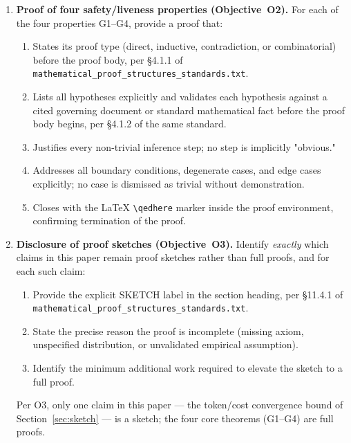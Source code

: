 \documentclass[12pt]{article}
\theoremstyle{definition}
\newcommand{\code}[1]{\texttt{#1}}
\newcommand{\ProofStd}{\code{mathematical\_proof\_\allowbreak structures\_standards.txt}}
\begin{document}
\begin{enumerate}
    \item \textbf{Proof of four safety/liveness properties (Objective~O2).}
          For each of the four properties G1--G4, provide a proof that:
          \begin{enumerate}
              \item[O2a.] States its proof type (direct, inductive,
                          contradiction, or combinatorial) before the proof
                          body, per \S4.1.1 of \ProofStd{}.
              \item[O2b.] Lists all hypotheses explicitly and validates
                          each hypothesis against a cited governing
                          document or standard mathematical fact before the
                          proof body begins, per \S4.1.2 of the same
                          standard.
              \item[O2c.] Justifies every non-trivial inference step;
                          no step is implicitly "obvious."
              \item[O2d.] Addresses all boundary conditions, degenerate
                          cases, and edge cases explicitly; no case is
                          dismissed as trivial without demonstration.
              \item[O2e.] Closes with the \LaTeX{} \verb|\qedhere| marker
                          inside the proof environment, confirming
                          termination of the proof.
          \end{enumerate}

    \item \textbf{Disclosure of proof sketches (Objective~O3).}
          Identify \emph{exactly} which claims in this paper remain proof
          sketches rather than full proofs, and for each such claim:
          \begin{enumerate}
              \item[O3a.] Provide the explicit SKETCH label in the
                          section heading, per \S11.4.1 of \ProofStd{}.
              \item[O3b.] State the precise reason the proof is
                          incomplete (missing axiom, unspecified
                          distribution, or unvalidated empirical
                          assumption).
              \item[O3c.] Identify the minimum additional work required
                          to elevate the sketch to a full proof.
          \end{enumerate}
          Per O3, only one claim in this paper --- the token/cost
          convergence bound of Section~\ref{sec:sketch} --- is a sketch;
          the four core theorems (G1--G4) are full proofs.


\end{enumerate}
\end{document}
